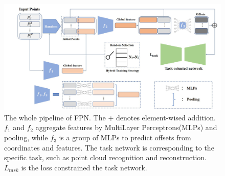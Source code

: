 \documentclass[a4paper,10pt]{article}
\begin{document}
\begin{figure}[h]
\centering
 \includegraphics[width=\linewidth]{images/fig2.png}
 \captionsetup{justification=justified, labelsep=period}
 \caption{The whole pipeline of FPN. The + denotes element-wised addition. $f_1$ and $f_2$ aggregate features by MultiLayer Perceptrons(MLPs) and pooling, while $f_3$ is a group of MLPs to predict offsets from coordinates and features. The task network is corresponding to the speciﬁc task, such as point cloud recognition and reconstruction. $L_{task}$ is the loss constrained the task network.}
\label{fig:fig2}
\end{figure}
\end{document}
